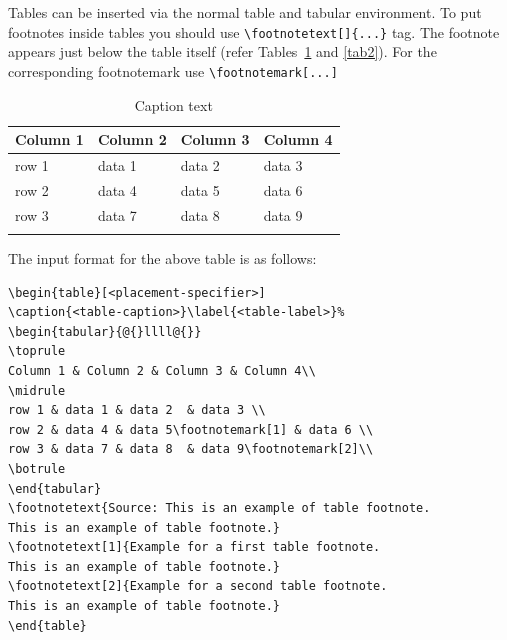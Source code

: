 \documentclass[lineno,pdflatex,sn-nature]{sn-jnl}%
\begin{document}
Tables can be inserted via the normal table and tabular environment. To put
footnotes inside tables you should use \verb+\footnotetext[]{...}+ tag.
The footnote appears just below the table itself (refer Tables~\ref{tab1} and \ref{tab2}). 
For the corresponding footnotemark use \verb+\footnotemark[...]+

\begin{table}[h]
\caption{Caption text}\label{tab1}%
\begin{tabular}{@{}llll@{}}
\toprule
Column 1 & Column 2  & Column 3 & Column 4\\
\midrule
row 1    & data 1   & data 2  & data 3  \\
row 2    & data 4   & data 5\footnotemark[1]  & data 6  \\
row 3    & data 7   & data 8  & data 9\footnotemark[2]  \\
\botrule
\end{tabular}
\end{table}

\noindent
The input format for the above table is as follows:

\bigskip
\begin{verbatim}
\begin{table}[<placement-specifier>]
\caption{<table-caption>}\label{<table-label>}%
\begin{tabular}{@{}llll@{}}
\toprule
Column 1 & Column 2 & Column 3 & Column 4\\
\midrule
row 1 & data 1 & data 2	 & data 3 \\
row 2 & data 4 & data 5\footnotemark[1] & data 6 \\
row 3 & data 7 & data 8	 & data 9\footnotemark[2]\\
\botrule
\end{tabular}
\footnotetext{Source: This is an example of table footnote. 
This is an example of table footnote.}
\footnotetext[1]{Example for a first table footnote.
This is an example of table footnote.}
\footnotetext[2]{Example for a second table footnote. 
This is an example of table footnote.}
\end{table}
\end{verbatim}
\bigskip
\end{document}
